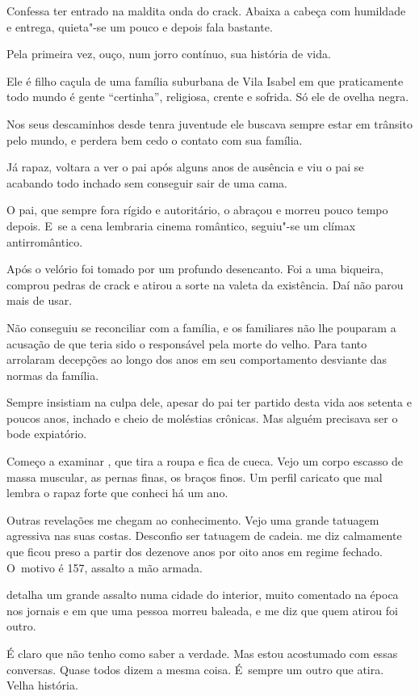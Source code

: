 Confessa ter entrado na maldita onda do crack. Abaixa a cabeça com
humildade e entrega, quieta"-se um pouco e depois fala bastante.

Pela primeira vez, ouço, num jorro contínuo, sua história de vida.

Ele é filho caçula de uma família suburbana de Vila Isabel em que
praticamente todo mundo é gente ``certinha'', religiosa, crente e
sofrida. Só ele de ovelha negra.

Nos seus descaminhos desde tenra juventude ele buscava sempre estar em
trânsito pelo mundo, e perdera bem cedo o contato com sua família.

Já rapaz, voltara a ver o pai após alguns anos de ausência e viu o pai se
acabando todo inchado sem conseguir sair de uma cama.

O pai, que sempre fora rígido e autoritário, o abraçou e morreu pouco
tempo depois. E~se a cena lembraria cinema romântico, seguiu"-se um
clímax antirromântico.

Após o velório  foi tomado por um profundo desencanto. Foi a uma
biqueira, comprou pedras de crack e atirou a sorte na valeta da
existência. Daí não parou mais de usar.

Não conseguiu se reconciliar com a família, e os familiares não lhe
pouparam a acusação de que teria sido o responsável pela morte do velho.
Para tanto arrolaram decepções ao longo dos anos em seu comportamento
desviante das normas da família.

Sempre insistiam na culpa dele, apesar do pai ter partido desta vida aos
setenta e poucos anos, inchado e cheio de moléstias crônicas. Mas alguém
precisava ser o bode expiatório.

\asterisc{}

Começo a examinar , que tira a roupa e fica de cueca. Vejo um corpo
escasso de massa muscular, as pernas finas, os braços finos. Um perfil
caricato que mal lembra o rapaz forte que conheci há um ano.

Outras revelações me chegam ao conhecimento. Vejo uma grande tatuagem
agressiva nas suas costas. Desconfio ser tatuagem de cadeia.  me diz
calmamente que ficou preso a partir dos dezenove anos por oito anos em
regime fechado. O~motivo é 157, assalto a mão armada.

 detalha um grande assalto numa cidade do interior, muito comentado na
época nos jornais e em que uma pessoa morreu baleada, e me diz que quem
atirou foi outro.

É claro que não tenho como saber a verdade. Mas estou acostumado com
essas conversas. Quase todos dizem a mesma coisa. É~sempre um outro que
atira. Velha história.

